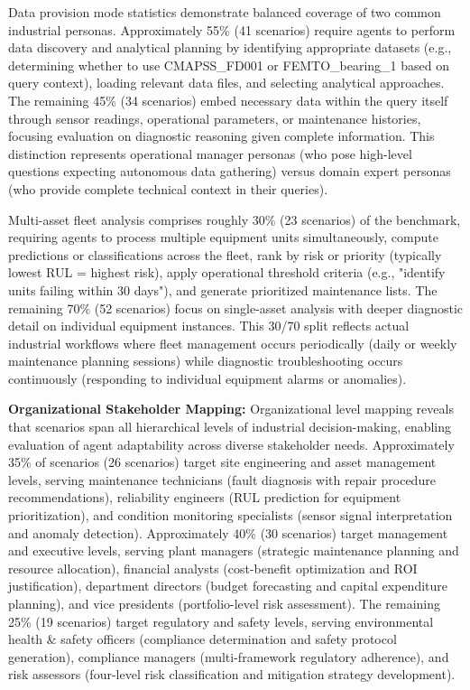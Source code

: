 \documentclass[sigconf, screen, nonacm]{acmart}
\begin{document}
Data provision mode statistics demonstrate balanced coverage of two common industrial personas. Approximately 55\% (41 scenarios) require agents to perform data discovery and analytical planning by identifying appropriate datasets (e.g., determining whether to use CMAPSS\_FD001 or FEMTO\_bearing\_1 based on query context), loading relevant data files, and selecting analytical approaches. The remaining 45\% (34 scenarios) embed necessary data within the query itself through sensor readings, operational parameters, or maintenance histories, focusing evaluation on diagnostic reasoning given complete information. This distinction represents operational manager personas (who pose high-level questions expecting autonomous data gathering) versus domain expert personas (who provide complete technical context in their queries).

Multi-asset fleet analysis comprises roughly 30\% (23 scenarios) of the benchmark, requiring agents to process multiple equipment units simultaneously, compute predictions or classifications across the fleet, rank by risk or priority (typically lowest RUL = highest risk), apply operational threshold criteria (e.g., "identify units failing within 30 days"), and generate prioritized maintenance lists. The remaining 70\% (52 scenarios) focus on single-asset analysis with deeper diagnostic detail on individual equipment instances. This 30/70 split reflects actual industrial workflows where fleet management occurs periodically (daily or weekly maintenance planning sessions) while diagnostic troubleshooting occurs continuously (responding to individual equipment alarms or anomalies).

\textbf{Organizational Stakeholder Mapping:} Organizational level mapping reveals that scenarios span all hierarchical levels of industrial decision-making, enabling evaluation of agent adaptability across diverse stakeholder needs. Approximately 35\% of scenarios (26 scenarios) target site engineering and asset management levels, serving maintenance technicians (fault diagnosis with repair procedure recommendations), reliability engineers (RUL prediction for equipment prioritization), and condition monitoring specialists (sensor signal interpretation and anomaly detection). Approximately 40\% (30 scenarios) target management and executive levels, serving plant managers (strategic maintenance planning and resource allocation), financial analysts (cost-benefit optimization and ROI justification), department directors (budget forecasting and capital expenditure planning), and vice presidents (portfolio-level risk assessment). The remaining 25\% (19 scenarios) target regulatory and safety levels, serving environmental health \& safety officers (compliance determination and safety protocol generation), compliance managers (multi-framework regulatory adherence), and risk assessors (four-level risk classification and mitigation strategy development).
\end{document}
